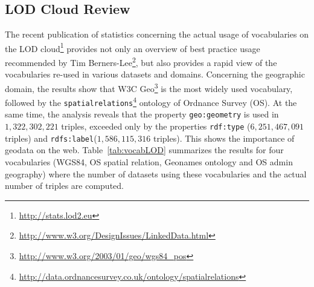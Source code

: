 \documentclass[a4paper,11pt]{report}
\begin{document}
\subsection{LOD Cloud Review}
The recent publication of statistics concerning the actual usage of vocabularies on the LOD cloud\footnote{\url{http://stats.lod2.eu}} provides not only an overview of best practice usage recommended by Tim Berners-Lee\footnote{\url{http://www.w3.org/DesignIssues/LinkedData.html}}, but also provides a rapid view of the vocabularies re-used in various datasets and domains. Concerning the geographic domain, the results show that W3C Geo\footnote{\url{http://www.w3.org/2003/01/geo/wgs84_pos}} is the most widely used vocabulary, followed by the \texttt{spatialrelations}\footnote{\url{http://data.ordnancesurvey.co.uk/ontology/spatialrelations}} ontology of Ordnance Survey (OS). At the same time, the analysis reveals that the property \texttt{geo:geometry} is used in $1,322,302,221$ triples, exceeded only by the properties \texttt{rdf:type} ($6,251,467,091$ triples) and \texttt{rdfs:label}($1,586,115,316$ triples). This shows the importance of geodata on the web. Table~\ref{tab:vocabLOD} summarizes the results for four vocabularies (WGS84, OS spatial relation, Geonames ontology and OS admin geography) where the number of datasets using these vocabularies and the actual number of triples are computed.
\begin{table}[!htbp]
\end{table}
\end{document}
